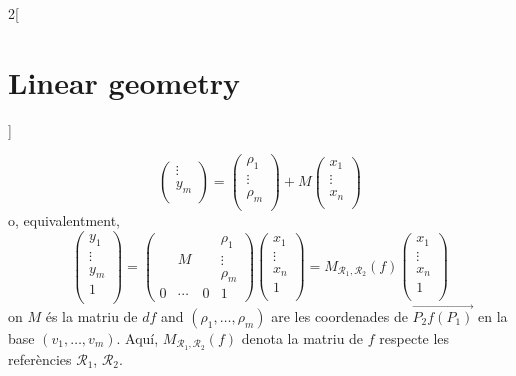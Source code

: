 \documentclass[class=article,10pt,crop=false]{standalone}
\begin{document}
\begin{multicols}{2}[\section{Linear geometry}]
\begin{prop}
$$\begin{pmatrix}
\vdots \\
y_m \\
\end{pmatrix}=\begin{pmatrix}
\rho_1 \\
\vdots \\
\rho_m \\
\end{pmatrix}+M\begin{pmatrix}
x_1 \\
\vdots \\
x_n \\
\end{pmatrix}$$
o, equivalentment,
$$\begin{pmatrix}
y_1 \\
\vdots \\
y_m \\
1 \\
\end{pmatrix}=\left(\begin{array}{ccc|c}
    & & &\rho_1\\
    & M & & \vdots\\
    & & & \rho_m\\
    \hline
    0 & \cdots & 0 &  1
\end{array}\right)\begin{pmatrix}
x_1 \\
\vdots \\
x_n \\
1 \\
\end{pmatrix}=M_{\mathcal{R}_1,\mathcal{R}_2}(f)\begin{pmatrix}
x_1 \\
\vdots \\
x_n \\
1 \\
\end{pmatrix}$$ on $M$ és la matriu de $df$ and $(\rho_1,\ldots,\rho_m)$ are les coordenades de $\overrightarrow{P_2f(P_1)}$ en la base $(v_1,\ldots,v_m)$. Aquí, $M_{\mathcal{R}_1,\mathcal{R}_2}(f)$ denota la matriu de $f$ respecte les referències $\mathcal{R}_1$, $\mathcal{R}_2$.
\end{prop}

\end{multicols}
\end{document}

